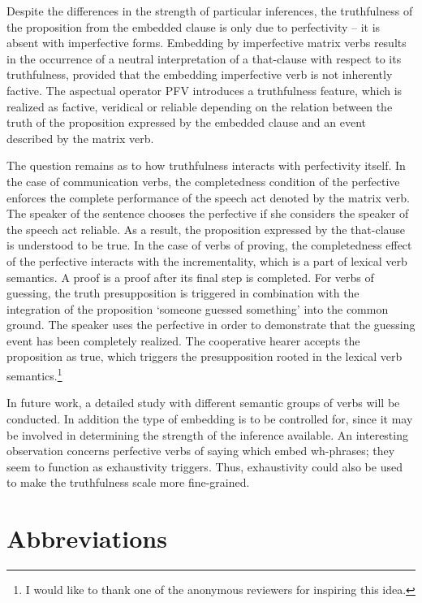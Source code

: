 \documentclass[output=paper,
  modfonts,
  newtxmath,
  hidelinks
		  ]{langscibook}
\begin{document}
Despite the differences in the strength of particular inferences, the truthfulness of the proposition from the embedded clause is only due to perfectivity – it is absent with imperfective forms. Embedding by imperfective matrix verbs results in the occurrence of a neutral interpretation of a that-clause with respect to its truthfulness, provided that the embedding imperfective verb is not inherently factive. The aspectual operator PFV introduces a truthfulness feature, which is realized as factive, veridical or reliable depending on the relation between the truth of the proposition expressed by the embedded clause and an event described by the matrix verb.

The question remains as to how truthfulness interacts with perfectivity itself. In the case of communication verbs, the completedness condition of the perfective enforces the complete performance of the speech act denoted by the matrix verb. The speaker of the sentence chooses the perfective if she considers the speaker of the speech act reliable. As a result, the proposition expressed by the that-clause is understood to be true. In the case of verbs of proving, the completedness effect of the perfective interacts with the incrementality, which is a part of lexical verb semantics. A proof is a proof after its final step is completed. For verbs of guessing, the truth presupposition is triggered in combination with the integration of the proposition `someone guessed something' into the common ground. The speaker uses the perfective in order to demonstrate that the guessing event has been completely realized. The cooperative hearer accepts the proposition as true, which triggers the presupposition rooted in the lexical verb semantics.\footnote{I would like to thank one of the anonymous reviewers for inspiring this idea.}

In future work, a detailed study with different semantic groups of verbs will be conducted. In addition the type of embedding is to be controlled for, since it may be involved in determining the strength of the inference available. An interesting observation concerns perfective verbs of saying which embed wh-phrases; they seem to function as exhaustivity triggers. Thus, exhaustivity could also be used to make the truthfulness scale more fine-grained.
 




\section*{Abbreviations}
\end{document}
